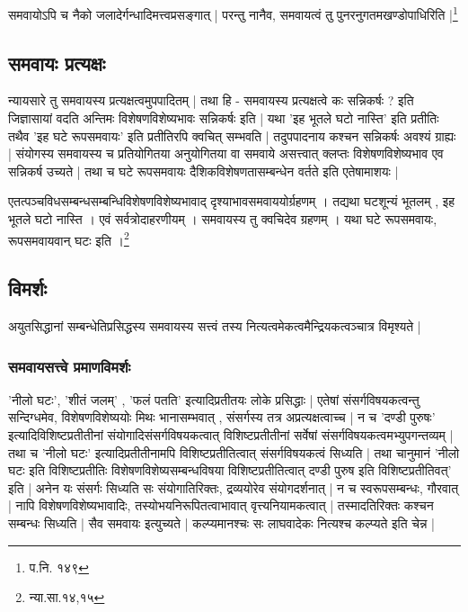 {\fontsize{11.7}{0}\selectfont\s समवायोऽपि च नैको जलादेर्गन्धादिमत्त्वप्रसङ्गात् | परन्तु नानैव, समवायत्वं तु पुनरनुगतमखण्डोपाधिरिति |\footnote{प.नि. १४९}}


\subsection{समवायः प्रत्यक्षः} 

न्यायसारे तु समवायस्य प्रत्यक्षत्वमुपपादितम् | तथा हि - समवायस्य प्रत्यक्षत्वे कः सन्निकर्षः ? इति जिज्ञासायां वदति अन्तिमः विशेषणविशेष्यभावः सन्निकर्षः इति | यथा 'इह भूतले घटो नास्ति' इति प्रतीतिः तथैव 'इह घटे रूपसमवायः' इति प्रतीतिरपि क्वचित् सम्भवति | तदुपपादनाय कश्चन सन्निकर्षः अवश्यं ग्राह्यः | संयोगस्य समवायस्य च प्रतियोगितया अनुयोगितया वा समवाये असत्त्वात् क्लप्तः विशेषणविशेष्यभाव एव सन्निकर्ष उच्यते | तथा च घटे रूपसमवायः दैशिकविशेषणतासम्बन्धेन वर्तते इति एतेषामाशयः |

{\fontsize{11.7}{0}\selectfont\s एतत्पञ्चविधसम्बन्धसम्बन्धिविशेषणविशेष्यभावाद् दृश्याभावसमवाययोर्ग्रहणम् । तद्यथा घटशून्यं भूतलम् , इह भूतले घटो नास्ति । एवं सर्वत्रोदाहरणीयम् । समवायस्य तु क्वचिदेव ग्रहणम् । यथा घटे रूपसमवायः, रूपसमवायवान् घटः इति ।\footnote{न्या.सा.१४,१५}}


\subsection{विमर्शः}

अयुतसिद्धानां सम्बन्धेतिप्रसिद्धस्य समवायस्य सत्त्वं तस्य नित्यत्वमेकत्वमैन्द्रियकत्वञ्चात्र विमृश्यते |

\subsubsection{समवायसत्त्वे प्रमाणविमर्शः}

'नीलो घटः', 'शीतं जलम्' , 'फलं पतति' इत्यादिप्रतीतयः लोके प्रसिद्धाः | एतेषां संसर्गविषयकत्वन्तु सन्दिग्धमेव, विशेषणविशेष्ययोः मिथः भानासम्भवात् , संसर्गस्य तत्र अप्रत्यक्षत्वाच्च | न च 'दण्डी  पुरुषः' इत्यादिविशिष्टप्रतीतीनां संयोगादिसंसर्गविषयकत्वात् विशिष्टप्रतीतीनां सर्वेषां संसर्गविषयकत्वमभ्युपगन्तव्यम् | तथा च 'नीलो घटः' इत्यादिप्रतीतीनामपि विशिष्टप्रतीतित्वात् संसर्गविषयकत्वं सिध्यति | तथा चानुमानं 'नीलो घटः इति विशिष्टप्रतीतिः विशेषणविशेष्यसम्बन्धविषया विशिष्टप्रतीतित्वात् दण्डी पुरुष इति विशिष्टप्रतीतिवत्' इति | अनेन यः संसर्गः सिध्यति सः संयोगातिरिक्तः, द्रव्ययोरेव संयोगदर्शनात् | न च स्वरूपसम्बन्धः, गौरवात् | नापि विशेषणविशेष्यभावादिः, तस्योभयनिरूपितत्वाभावात् वृत्त्यनियामकत्वात् | तस्मादतिरिक्तः कश्चन सम्बन्धः सिध्यति | सैव समवायः इत्युच्यते | कल्प्यमानश्चः सः लाघवादेकः नित्यश्च कल्प्यते इति चेन्न | 

